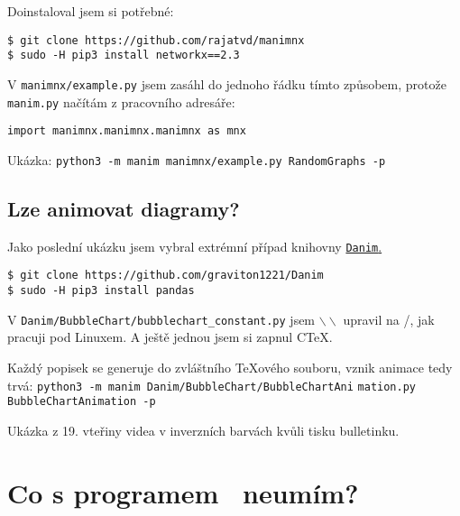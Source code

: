 Doinstaloval jsem si potřebné:
\begin{lstlisting}
$ git clone https://github.com/rajatvd/manimnx
$ sudo -H pip3 install networkx==2.3
\end{lstlisting}

V \texttt{manimnx/example.py} jsem zasáhl do jednoho řádku tímto způsobem, protože \texttt{manim.py} načítám z pracovního adresáře:
\begin{lstlisting}
import manimnx.manimnx.manimnx as mnx
\end{lstlisting}

Ukázka: \texttt{python3 -m manim manimnx/example.py RandomGraphs -p}
\smallskip

\maldelka=15mm
\noindent
{}\hfill
{}\hfill
{}\hfill
{}%




\subsection{Lze animovat diagramy?}
Jako poslední ukázku jsem vybral extrémní případ knihovny \href{https://github.com/graviton1221/Danim}{\texttt{Danim}.}

\begin{lstlisting}
$ git clone https://github.com/graviton1221/Danim
$ sudo -H pip3 install pandas
\end{lstlisting}

V \texttt{Danim/BubbleChart/bubblechart\_constant.py} jsem $\backslash\backslash$ upravil na /, jak pracuji pod Linuxem. A ještě jednou jsem si zapnul C\TeX.

Každý popisek se generuje do zvláštního \TeX ového souboru, vznik animace tedy trvá:
\texttt{python3 -m manim Danim/BubbleChart/BubbleChartAni} \texttt{mation.py BubbleChartAnimation -p}

Ukázka z 19. vteřiny videa v inverzních barvách kvůli tisku bulletinku.
\smallskip

\maldelka=55mm
\noindent
{}%
\medskip


\section{Co s programem \Manim\ neumím?}

